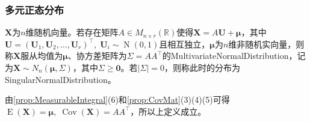 \subsubsection{多元正态分布}
\begin{definition}\label{def:MultiNormal}
	$\mathbf{X}$为$n$维随机向量。若存在矩阵$A\in M_{n\times r}(\mathbb{R})$使得$\mathbf{X}=A\mathbf{U}+\boldsymbol{\mu}$，其中$\mathbf{U}=(\mathbf{U}_1,\mathbf{U}_2,\dots,\mathbf{U}_r)^{\top},\;\mathbf{U}_i\sim \operatorname{N}(0,1)$且相互独立，$\boldsymbol{\mu}$为$n$维非随机实向量，则称$\mathbf{X}$服从均值为$\boldsymbol{\mu}$、协方差矩阵为$\Sigma=AA^{\top}$的\gls{MultivariateNormalDistribution}，记为$\mathbf{X}\sim N_n(\boldsymbol{\mu},\Sigma)$，其中$\Sigma\geqslant\mathbf{0}$。若$|\Sigma|=0$，则称此时的分布为\gls{SingularNormalDistribution}。
\end{definition}
\begin{note}
	由\cref{prop:MeasurableIntegral}(6)和\cref{prop:CovMat}(3)(4)(5)可得$\operatorname{E}(\mathbf{X})=\boldsymbol{\mu},\;\operatorname{Cov}(\mathbf{X})=AA^{\top}$，所以上定义成立。
\end{note}
